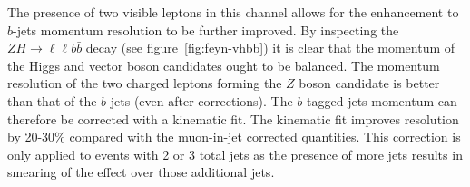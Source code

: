 The presence of two visible leptons in this channel allows for the enhancement
to $b$-jets momentum resolution to be further improved. By inspecting the $Z\!H\!
\to\! \ell\ell b\bar{b}$ decay (see figure~\ref{fig:feyn-vhbb}) it is clear that
the momentum of the Higgs and vector boson candidates ought to be balanced. The
momentum resolution of the two charged leptons forming the $Z$ boson candidate
is better than that of the $b$-jets (even after corrections). The $b$-tagged
jets momentum can therefore be corrected with a kinematic fit. The kinematic fit
improves resolution by 20-30\% compared with the muon-in-jet corrected
quantities. This correction is only applied to events with 2 or 3 total jets as
the presence of more jets results in smearing of the effect over those
additional jets.
